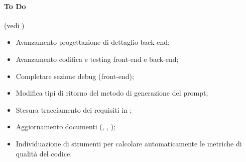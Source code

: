 \paragraph{To Do} (vedi )
\begin{itemize}
	\item Avanzamento progettazione di dettaglio back-end;
	\item Avanzamento codifica e testing front-end e back-end;
	\item Completare sezione debug (front-end);
	\item Modifica tipi di ritorno del metodo di generazione del prompt;
	\item Stesura tracciamento dei requisiti in \ST;
	\item Aggiornamento documenti (\PdQ, \ST, \MU);
	\item Individuazione di strumenti per calcolare automaticamente le metriche di qualità del codice.
\end{itemize}


